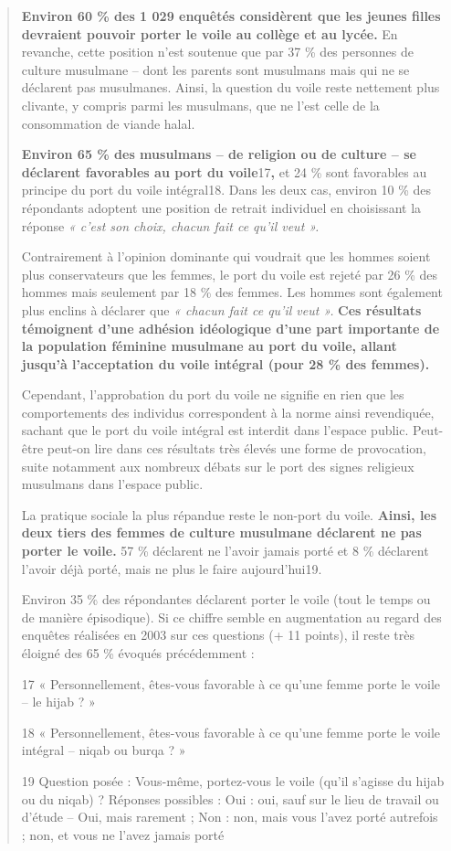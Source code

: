 \begin{quote}
\textbf{Environ 60 \% des 1 029 enquêtés considèrent que les jeunes
filles devraient pouvoir porter le voile au collège et au lycée.} En
revanche, cette position n'est soutenue que par 37 \% des personnes de
culture musulmane -- dont les parents sont musulmans mais qui ne se
déclarent pas musulmanes. Ainsi, la question du voile reste nettement
plus clivante, y compris parmi les musulmans, que ne l'est celle de la
consommation de viande halal.

\textbf{Environ 65 \% des musulmans -- de religion ou de culture -- se
déclarent favorables au port du voile}17\textbf{,} et 24 \% sont
favorables au principe du port du voile intégral18. Dans les deux cas,
environ 10 \% des répondants adoptent une position de retrait individuel
en choisissant la réponse \emph{« c'est son choix, chacun fait ce qu'il
veut ».}

Contrairement à l'opinion dominante qui voudrait que les hommes soient
plus conservateurs que les femmes, le port du voile est rejeté par 26 \%
des hommes mais seulement par 18 \% des femmes. Les hommes sont
également plus enclins à déclarer que \emph{« chacun fait ce qu'il veut
».} \textbf{Ces résultats témoignent d'une adhésion idéologique d'une
part importante de la population féminine musulmane au port du voile,
allant jusqu'à l'acceptation du voile intégral (pour 28 \% des femmes).}

Cependant, l'approbation du port du voile ne signifie en rien que les
comportements des individus correspondent à la norme ainsi revendiquée,
sachant que le port du voile intégral est interdit dans l'espace public.
Peut-être peut-on lire dans ces résultats très élevés une forme de
provocation, suite notamment aux nombreux débats sur le port des signes
religieux musulmans dans l'espace public.

La pratique sociale la plus répandue reste le non-port du voile.
\textbf{Ainsi, les deux tiers des femmes de culture musulmane déclarent
ne pas porter le voile.} 57 \% déclarent ne l'avoir jamais porté et 8 \%
déclarent l'avoir déjà porté, mais ne plus le faire aujourd'hui19.

Environ 35 \% des répondantes déclarent porter le voile (tout le temps
ou de manière épisodique). Si ce chiffre semble en augmentation au
regard des enquêtes réalisées en 2003 sur ces questions (+ 11 points),
il reste très éloigné des 65 \% évoqués précédemment :

17 « Personnellement, êtes-vous favorable à ce qu'une femme porte le
voile -- le hijab ? »

18 « Personnellement, êtes-vous favorable à ce qu'une femme porte le
voile intégral -- niqab ou burqa ? »

19 Question posée : Vous-même, portez-vous le voile (qu'il s'agisse du
hijab ou du niqab) ? Réponses possibles : Oui : oui, sauf sur le lieu de
travail ou d'étude -- Oui, mais rarement ; Non : non, mais vous l'avez
porté autrefois ; non, et vous ne l'avez jamais porté


\end{quote}

